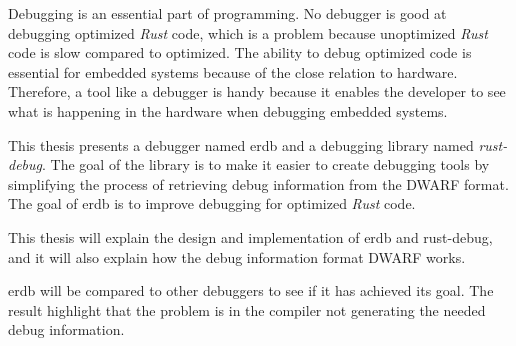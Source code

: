 Debugging is an essential part of programming.
No debugger is good at debugging optimized \emph{Rust} code, which is a problem because unoptimized \emph{Rust} code is slow compared to optimized.
The ability to debug optimized code is essential for embedded systems because of the close relation to hardware.
Therefore, a tool like a debugger is handy because it enables the developer to see what is happening in the hardware when debugging embedded systems. 

This thesis presents a debugger named \acrshort{erdb} and a debugging library named \emph{rust-debug}.
The goal of the library is to make it easier to create debugging tools by simplifying the process of retrieving debug information from the \acrshort{DWARF} format.
The goal of \acrshort{erdb} is to improve debugging for optimized \emph{Rust} code. 

This thesis will explain the design and implementation of \acrshort{erdb} and rust-debug, and it will also explain how the debug information format \acrshort{DWARF} works.

\acrshort{erdb} will be compared to other debuggers to see if it has achieved its goal.
The result highlight that the problem is in the compiler not generating the needed debug information.
